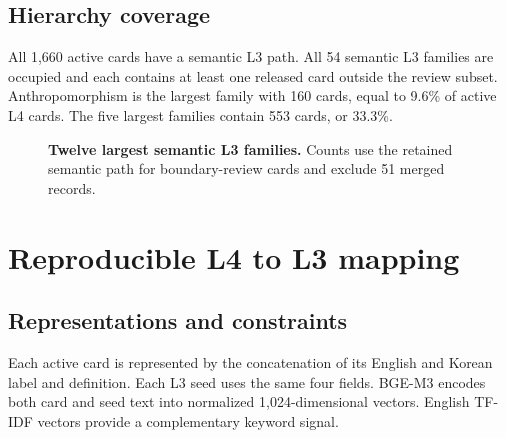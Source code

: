 \documentclass[11pt,a4paper]{article}
\begin{document}
\subsection{Hierarchy coverage}

All 1,660 active cards have a semantic L3 path. All 54 semantic L3 families are
occupied and each contains at least one released card outside the review
subset. Anthropomorphism is the largest family with 160 cards, equal to 9.6\%
of active L4 cards. The five largest families contain 553 cards, or 33.3\%.

\begin{figure}[H]
\centering
{}
\caption{\textbf{Twelve largest semantic L3 families.} Counts use the retained
semantic path for boundary-review cards and exclude 51 merged records.}
\label{fig:l3}
\end{figure}

\section{Reproducible L4 to L3 mapping}

\subsection{Representations and constraints}

Each active card is represented by the concatenation of its English and Korean
label and definition. Each L3 seed uses the same four fields. BGE-M3 encodes
both card and seed text into normalized 1,024-dimensional vectors. English
TF-IDF vectors provide a complementary keyword signal.
\end{document}
